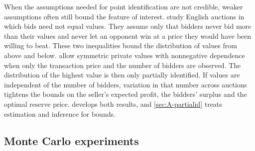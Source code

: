 When the assumptions needed for point identification are not credible, weaker assumptions often still bound
the feature of interest. \citet{HaileTamer2003} study English auctions in which bids need not equal values.
They assume only that bidders never bid more than their values and never let an opponent win at a price they
would have been willing to beat. These two inequalities bound the distribution of values from above and below.
\citet[pp.~493--499]{AradillasLopezGandhiQuint2013} allow symmetric private values with nonnegative dependence
when only the transaction price and the number of bidders are observed. The distribution of the highest value is then only partially
identified. If values are independent of the number of bidders, variation in that number across auctions tightens
the bounds on the seller's expected profit, the bidders' surplus and the optimal reserve price.
 develops both results, and \cref{sec:A-partialid} treats estimation and inference
for bounds.

\subsection{Monte Carlo experiments}\label{sec:A-montecarlo}

